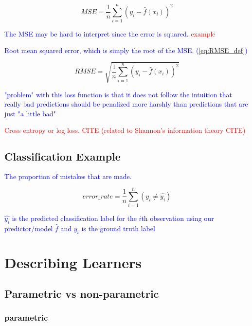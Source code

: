 \begin{equation}
{MSE = \frac{1}{n}\sum_{i=1}^{n}(y_i - \hat{f}(x_i))^2}
\label{eq:MSE_def}
\end{equation}

\textcolor{blue}{The MSE may be hard to interpret since the error is squared. \textcolor{red}{example}}

\textcolor{blue}{Root mean squared error, which is simply the root of the MSE. (\ref{eq:RMSE_def})}

\begin{equation}
{RMSE = \sqrt{\frac{1}{n}\sum_{i=1}^{n}(y_i - \hat{f}(x_i))^2}}
\label{eq:RMSE_def}
\end{equation}

\textcolor{blue}{"problem" with this loss function is that it does not follow the intuition that really bad predictions should be penalized more harshly than predictions that are just "a little bad"}

\textcolor{red}{Cross entropy or log loss. \textcolor{red}{CITE} (related to Shannon's information theory \textcolor{red}{CITE})}



\subsection{Classification Example}

\textcolor{blue}{The proportion of mistakes that are made.}

\begin{equation}
{error\_rate = \frac{1}{n}\sum_{i=1}^{n}(y_i \ne \hat{y_i})}
\label{eq:class_error_rate_def}
\end{equation}

\textcolor{blue}{$\hat{y_i}$ is the predicted classification label for the $i$th observation using our predictor/model $\hat{f}$ and $y_i$ is the ground truth label}

\section{Describing Learners}

\subsection{Parametric vs non-parametric}

\subsubsection{parametric}

